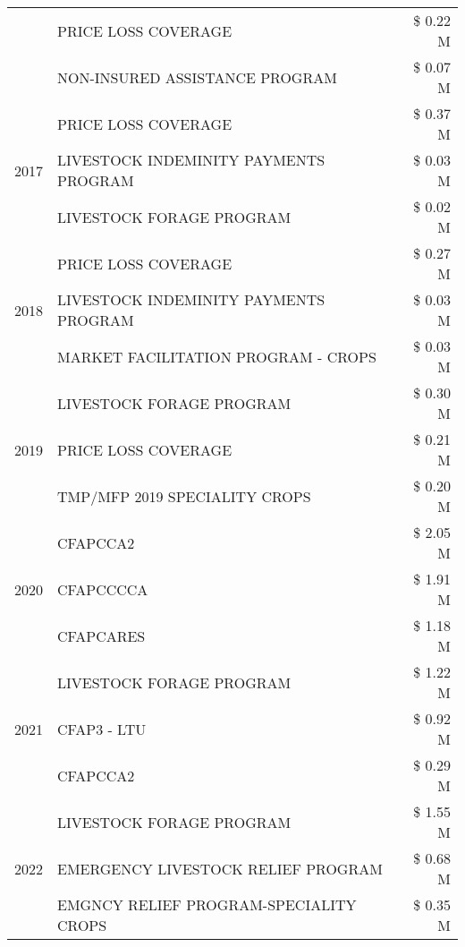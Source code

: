 \begin{tabular}{llr}
 & PRICE LOSS COVERAGE & \$ 0.22 M \\
 & NON-INSURED ASSISTANCE PROGRAM & \$ 0.07 M \\
\cline{1-3}
\multirow[t]{3}{*}{2017} & PRICE LOSS COVERAGE & \$ 0.37 M \\
 & LIVESTOCK INDEMINITY PAYMENTS PROGRAM & \$ 0.03 M \\
 & LIVESTOCK FORAGE PROGRAM & \$ 0.02 M \\
\cline{1-3}
\multirow[t]{3}{*}{2018} & PRICE LOSS COVERAGE & \$ 0.27 M \\
 & LIVESTOCK INDEMINITY PAYMENTS PROGRAM & \$ 0.03 M \\
 & MARKET FACILITATION PROGRAM - CROPS & \$ 0.03 M \\
\cline{1-3}
\multirow[t]{3}{*}{2019} & LIVESTOCK FORAGE PROGRAM & \$ 0.30 M \\
 & PRICE LOSS COVERAGE & \$ 0.21 M \\
 & TMP/MFP 2019 SPECIALITY CROPS & \$ 0.20 M \\
\cline{1-3}
\multirow[t]{3}{*}{2020} & CFAPCCA2 & \$ 2.05 M \\
 & CFAPCCCCA & \$ 1.91 M \\
 & CFAPCARES & \$ 1.18 M \\
\cline{1-3}
\multirow[t]{3}{*}{2021} & LIVESTOCK FORAGE PROGRAM & \$ 1.22 M \\
 & CFAP3 - LTU & \$ 0.92 M \\
 & CFAPCCA2 & \$ 0.29 M \\
\cline{1-3}
\multirow[t]{3}{*}{2022} & LIVESTOCK FORAGE PROGRAM & \$ 1.55 M \\
 & EMERGENCY LIVESTOCK RELIEF PROGRAM & \$ 0.68 M \\
 & EMGNCY RELIEF PROGRAM-SPECIALITY CROPS & \$ 0.35 M \\
\cline{1-3}
\bottomrule
\end{tabular}
